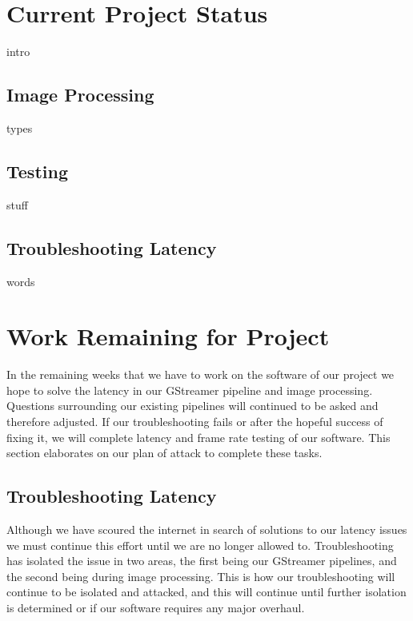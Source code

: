 \documentclass[letterpaper,10pt,serif,draftclsnofoot,onecolumn,compsoc,titlepage]{IEEEtran}
\begin{document}
\section{Current Project Status}

intro\\

\subsection{Image Processing}

types\\

\subsection{Testing}

stuff\\

\subsection{Troubleshooting Latency}

words\\

\section{Work Remaining for Project}

In the remaining weeks that we have to work on the software of our project we hope to 
solve the latency in our GStreamer pipeline and image processing. Questions surrounding 
our existing pipelines will continued to be asked and therefore adjusted. If our 
troubleshooting fails or after the hopeful success of fixing it, we will complete latency 
and frame rate testing of our software. This section elaborates on our plan of attack to 
complete these tasks.\\

\subsection{Troubleshooting Latency}

Although we have scoured the internet in search of solutions to our latency issues we must 
continue this effort until we are no longer allowed to. Troubleshooting has isolated the 
issue in two areas, the first being our GStreamer pipelines, and the second being during 
image processing. This is how our troubleshooting will continue to be isolated and attacked, 
and this will continue until further isolation is determined or if our software requires 
any major overhaul. \\
\end{document}
